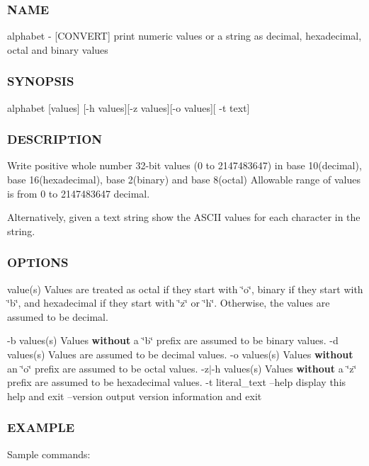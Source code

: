 \subsubsection*{N\+A\+ME}

alphabet -\/ \mbox{[}C\+O\+N\+V\+E\+RT\mbox{]} print numeric values or a string as decimal, hexadecimal, octal and binary values \subsubsection*{S\+Y\+N\+O\+P\+S\+IS}

alphabet \mbox{[}values\mbox{]} \mbox{[}-\/h values\mbox{]}\mbox{[}-\/z values\mbox{]}\mbox{[}-\/o values\mbox{]}\mbox{[} -\/t text\mbox{]} \subsubsection*{D\+E\+S\+C\+R\+I\+P\+T\+I\+ON}

Write positive whole number 32-\/bit values (0 to 2147483647) in base 10(decimal), base 16(hexadecimal), base 2(binary) and base 8(octal) Allowable range of values is from 0 to 2147483647 decimal.

Alternatively, given a text string show the A\+S\+C\+II values for each character in the string. \subsubsection*{O\+P\+T\+I\+O\+NS}

value(s) Values are treated as octal if they start with \char`\"{}o\char`\"{}, binary if they start with \char`\"{}b\char`\"{}, and hexadecimal if they start with \char`\"{}z\char`\"{} or \char`\"{}h\char`\"{}. Otherwise, the values are assumed to be decimal.

-\/b values(s) Values {\bfseries without} a \char`\"{}b\char`\"{} prefix are assumed to be binary values. -\/d values(s) Values are assumed to be decimal values. -\/o values(s) Values {\bfseries without} an \char`\"{}o\char`\"{} prefix are assumed to be octal values. -\/z$\vert$-\/h values(s) Values {\bfseries without} a \char`\"{}z\char`\"{} prefix are assumed to be hexadecimal values. -\/t literal\+\_\+text --help display this help and exit --version output version information and exit \subsubsection*{E\+X\+A\+M\+P\+LE}

Sample commands\+:

